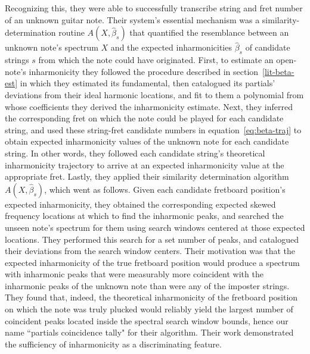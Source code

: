 \documentclass[12pt]{cmuthesis}
\begin{document}
Recognizing this, they were able to successfully transcribe string and fret number of an unknown guitar note. Their system's essential mechanism was a similarity-determination routine $A(X,\hat{\beta}_s)$ that quantified the resemblance between an unknown note's spectrum $X$ and the expected inharmonicities $\hat\beta_s$ of candidate strings $s$ from which the note could have originated. First, to estimate an open-note's inharmonicity they followed the procedure described in section~\ref{lit-beta-est} in which they estimated its fundamental, then catalogued its partials' deviations from their ideal harmonic locations, and fit to them a polynomial from whose coefficients they derived the inharmonicity estimate. Next, they inferred the corresponding fret on which the note could be played for each candidate string, and used these string-fret candidate numbers in equation~\eqref{eq:beta-traj} to obtain expected inharmonicity values of the unknown note for each candidate string. In other words, they followed each candidate string's theoretical inharmonicity trajectory to arrive at an expected inharmonicity value at the appropriate fret. Lastly, they applied their similarity determination algorithm $A(X,\hat{\beta}_s)$, which went as follows. Given each candidate fretboard position's expected inharmonicity, they obtained the corresponding expected skewed frequency locations at which to find the inharmonic peaks, and searched the unseen note's spectrum for them using search windows centered at those expected locations. They performed this search for a set number of peaks, and catalogued their deviations from the search window centers. Their motivation was that the expected inharmonicity of the true fretboard position would produce a spectrum with inharmonic peaks that were measurably more coincident with the inharmonic peaks of the unknown note than were any of the imposter strings. They found that, indeed, the theoretical inharmonicity of the fretboard position on which the note was truly plucked would reliably yield the largest number of coincident peaks located inside the spectral search window bounds, hence our name ``partials coincidence tally" for their algorithm. Their work demonstrated the sufficiency of inharmonicity as a discriminating feature.
\end{document}
